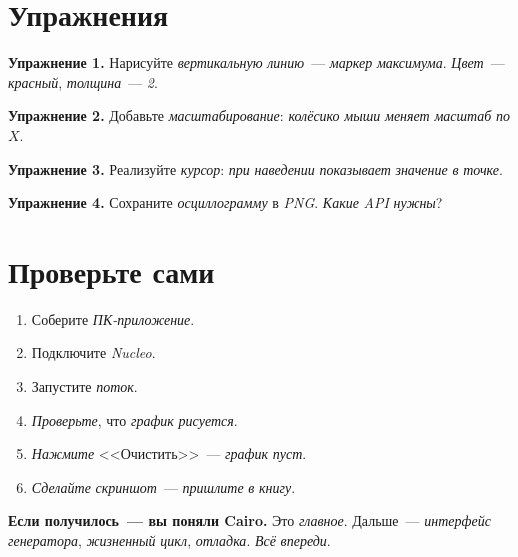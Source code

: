 \section{Упражнения}
\label{sec:render-exercises}

\begin{exercisebox}
\textbf{Упражнение 1.} Нарисуйте \emph{вертикальную}
\emph{линию}~--- \emph{маркер} \emph{максимума}. \emph{Цвет}~---
\emph{красный}, \emph{толщина}~--- \emph{2}.
\end{exercisebox}

\begin{exercisebox}
\textbf{Упражнение 2.} Добавьте \emph{масштабирование}:
\emph{колёсико} \emph{мыши} \emph{меняет} \emph{масштаб} \emph{по}
\emph{$X$}.
\end{exercisebox}

\begin{exercisebox}
\textbf{Упражнение 3.} Реализуйте \emph{курсор}: \emph{при}
\emph{наведении} \emph{показывает} \emph{значение} \emph{в}
\emph{точке}.
\end{exercisebox}

\begin{exercisebox}
\textbf{Упражнение 4.} Сохраните \emph{осциллограмму} в
\emph{PNG}. \emph{Какие} \emph{API} \emph{нужны}?
\end{exercisebox}

\section{Проверьте сами}
\label{sec:render-check}

\begin{enumerate}
    \item Соберите \emph{ПК-приложение}.
    \item Подключите \emph{Nucleo}.
    \item Запустите \emph{поток}.
    \item \emph{Проверьте}, что \emph{график} \emph{рисуется}.
    \item \emph{Нажмите} <<Очистить>>~--- \emph{график} \emph{пуст}.
    \item \emph{Сделайте} \emph{скриншот}~--- \emph{пришлите}
          \emph{в} \emph{книгу}.
\end{enumerate}

\begin{ideabox}
\textbf{Если получилось~--- вы поняли Cairo.} Это
\emph{главное}. Дальше~--- \emph{интерфейс} \emph{генератора},
\emph{жизненный} \emph{цикл}, \emph{отладка}. \emph{Всё}
\emph{впереди}.
\end{ideabox}


